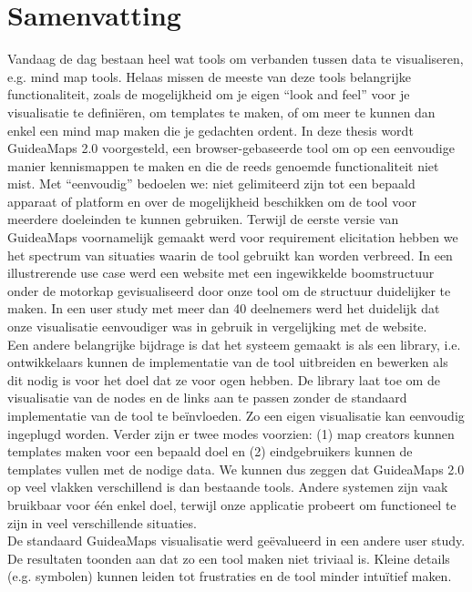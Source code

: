 \section*{Samenvatting}\enlargethispage{1.5\baselineskip}

Vandaag de dag bestaan heel wat tools om verbanden tussen data te visualiseren, e.g. mind map tools. Helaas missen de meeste van deze tools belangrijke functionaliteit, zoals de mogelijkheid om je eigen ``look and feel'' voor je visualisatie te defini\"eren, om templates te maken, of om meer te kunnen dan enkel een mind map maken die je gedachten ordent. In deze thesis wordt GuideaMaps 2.0 voorgesteld, een browser-gebaseerde tool om op een eenvoudige manier kennismappen te maken en die de reeds genoemde functionaliteit niet mist. Met ``eenvoudig'' bedoelen we: niet gelimiteerd zijn tot een bepaald apparaat of platform en over de mogelijkheid beschikken om de tool voor meerdere doeleinden te kunnen gebruiken. Terwijl de eerste versie van GuideaMaps voornamelijk gemaakt werd voor requirement elicitation hebben we het spectrum van situaties waarin de tool gebruikt kan worden verbreed. In een illustrerende use case werd een website met een ingewikkelde boomstructuur onder de motorkap gevisualiseerd door onze tool om de structuur duidelijker te maken. In een user study met meer dan 40 deelnemers werd het duidelijk dat onze visualisatie eenvoudiger was in gebruik in vergelijking met de website.\\

Een andere belangrijke bijdrage is dat het systeem gemaakt is als een library, i.e. ontwikkelaars kunnen de implementatie van de tool uitbreiden en bewerken als dit nodig is voor het doel dat ze voor ogen hebben. De library laat toe om de visualisatie van de nodes en de links aan te passen zonder de standaard implementatie van de tool te be\"invloeden. Zo een eigen visualisatie kan eenvoudig ingeplugd worden. Verder zijn er twee modes voorzien: (1) map creators kunnen templates maken voor een bepaald doel en (2) eindgebruikers kunnen de templates vullen met de nodige data. We kunnen dus zeggen dat GuideaMaps 2.0 op veel vlakken verschillend is dan bestaande tools. Andere systemen zijn vaak bruikbaar voor \'e\'en enkel doel, terwijl onze applicatie probeert om functioneel te zijn in veel verschillende situaties.\\

De standaard GuideaMaps visualisatie werd ge\"evalueerd in een andere user study. De resultaten toonden aan dat zo een tool maken niet triviaal is. Kleine details (e.g. symbolen) kunnen leiden tot frustraties en de tool minder intu\"itief maken.